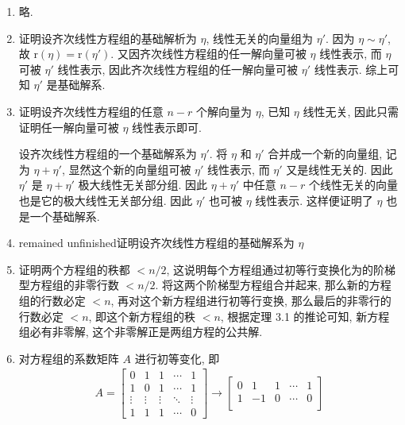 \documentclass[a4paper, 11pt]{ctexart}
\newcommand{\rank}{\mathrm{r}}
\begin{document}
\begin{enumerate}
    \item %
        略.
    \item %
        {\heiti 证明}\quad 设齐次线性方程组的基础解析为 $\eta$, 线性无关的向量组为 $\eta'$.
        因为 $\eta \sim \eta'$, 故 $\rank(\eta) = \rank(\eta')$. 又因齐次线性方程组的任一解向量可被 $\eta$ 线性表示, 而 $\eta$ 可被 $\eta'$ 线性表示, 因此齐次线性方程组的任一解向量可被 $\eta'$ 线性表示.
        综上可知 $\eta'$ 是基础解系.
    \item %
        {\heiti 证明}\quad 设齐次线性方程组的任意 $n - r$ 个解向量为 $\eta$, 已知 $\eta$ 线性无关, 因此只需证明任一解向量可被 $\eta$ 线性表示即可.
        
        设齐次线性方程组的一个基础解系为 $\eta'$. 将 $\eta$ 和 $\eta'$ 合并成一个新的向量组, 记为 $\eta + \eta'$, 显然这个新的向量组可被 $\eta'$ 线性表示, 而 $\eta'$ 又是线性无关的.
        因此 $\eta'$ 是 $\eta + \eta'$ 极大线性无关部分组. 因此 $\eta + \eta'$ 中任意 $n - r$ 个线性无关的向量也是它的极大线性无关部分组. 因此 $\eta'$ 也可被 $\eta$ 线性表示.
        这样便证明了 $\eta$ 也是一个基础解系.  
    \item %
        {\color{red} remained unfinished}{\heiti 证明}\quad 设齐次线性方程组的基础解系为 $\eta$
    \item %
        {\heiti 证明}\quad 两个方程组的秩都 $< n/2$, 这说明每个方程组通过初等行变换化为的阶梯型方程组的非零行数 $< n / 2$.
        将这两个阶梯型方程组合并起来, 那么新的方程组的行数必定 $< n$, 再对这个新方程组进行初等行变换, 那么最后的非零行的行数必定 $< n$,
        即这个新方程组的秩 $< n$, 根据定理 3.1 的推论可知, 新方程组必有非零解, 这个非零解正是两组方程的公共解.
    \item %
        对方程组的系数矩阵 $A$ 进行初等变化, 即
        \begin{gather*}
            A =
            \begin{bmatrix}
                0 & 1 & 1 & \cdots & 1 \\
                1 & 0 & 1 & \cdots & 1 \\
                \vdots & \vdots & \vdots & \ddots & \vdots \\
                1 & 1 & 1 & \cdots & 0
            \end{bmatrix}
            \rightarrow
            \begin{bmatrix}
                0 & 1 & 1 & \cdots & 1 \\
                1 & -1 & 0 & \cdots & 0 \\

\end{bmatrix}
\end{gather*}
\end{enumerate}
\end{document}
